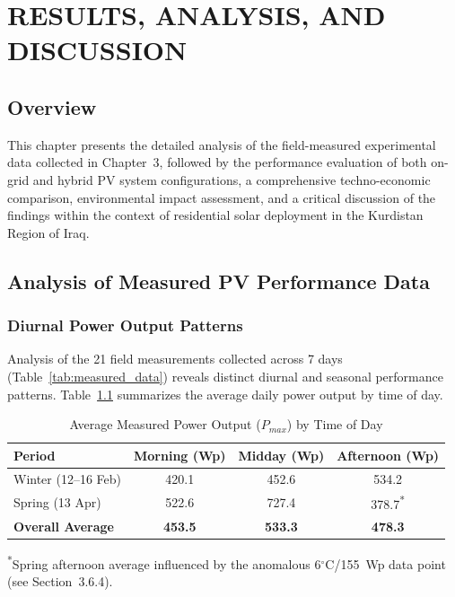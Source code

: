 \chapter{RESULTS, ANALYSIS, AND DISCUSSION}

\section{Overview}

This chapter presents the detailed analysis of the field-measured experimental data collected in Chapter~3, followed by the performance evaluation of both on-grid and hybrid PV system configurations, a comprehensive techno-economic comparison, environmental impact assessment, and a critical discussion of the findings within the context of residential solar deployment in the Kurdistan Region of Iraq.


\section{Analysis of Measured PV Performance Data}

\subsection{Diurnal Power Output Patterns}

Analysis of the 21 field measurements collected across 7 days (Table~\ref{tab:measured_data}) reveals distinct diurnal and seasonal performance patterns. Table~\ref{tab:daily_avg} summarizes the average daily power output by time of day.

\begin{table}[H]
\centering
\caption{Average Measured Power Output ($P_{max}$) by Time of Day}
\label{tab:daily_avg}
\begin{tabular}{@{}l c c c@{}}
\toprule
\textbf{Period} & \textbf{Morning (Wp)} & \textbf{Midday (Wp)} & \textbf{Afternoon (Wp)} \\
\midrule
Winter (12--16 Feb) & 420.1 & 452.6 & 534.2 \\
Spring (13 Apr) & 522.6 & 727.4 & 378.7\textsuperscript{*} \\
\textbf{Overall Average} & \textbf{453.5} & \textbf{533.3} & \textbf{478.3} \\
\bottomrule
\end{tabular}
\begin{flushleft}
\small\textsuperscript{*}Spring afternoon average influenced by the anomalous 6$^{\circ}$C/155~Wp data point (see Section~3.6.4).
\end{flushleft}
\end{table}

